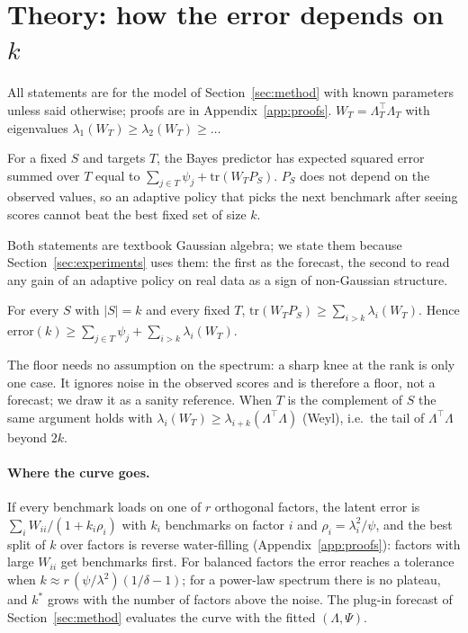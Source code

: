 \section{Theory: how the error depends on $k$}
\label{sec:theory}
All statements are for the model of Section~\ref{sec:method} with known parameters unless said otherwise; proofs are in Appendix~\ref{app:proofs}.
$W_T=\Lambda_T^\top\Lambda_T$ with eigenvalues $\lambda_1(W_T)\ge\lambda_2(W_T)\ge\dots$

\begin{proposition}\label{prop:decomp}
For a fixed $S$ and targets $T$, the Bayes predictor has expected squared error summed over $T$ equal to $\sum_{j\in T}\psi_j+\mathrm{tr}(W_TP_S)$. $P_S$ does not depend on the observed values, so an adaptive policy that picks the next benchmark after seeing scores cannot beat the best fixed set of size $k$.
\end{proposition}
Both statements are textbook Gaussian algebra; we state them because Section~\ref{sec:experiments} uses them: the first as the forecast, the second to read any gain of an adaptive policy on real data as a sign of non-Gaussian structure.

\begin{proposition}\label{prop:floor}
For every $S$ with $|S|=k$ and every fixed $T$, $\mathrm{tr}(W_TP_S)\ge\sum_{i>k}\lambda_i(W_T)$. Hence $\mathrm{error}(k)\ge\sum_{j\in T}\psi_j+\sum_{i>k}\lambda_i(W_T)$.
\end{proposition}
The floor needs no assumption on the spectrum: a sharp knee at the rank is only one case.
It ignores noise in the observed scores and is therefore a floor, not a forecast; we draw it as a sanity reference.
When $T$ is the complement of $S$ the same argument holds with $\lambda_i(W_T)\ge\lambda_{i+k}(\Lambda^\top\Lambda)$ (Weyl), i.e.\ the tail of $\Lambda^\top\Lambda$ beyond $2k$.

\paragraph{Where the curve goes.}
If every benchmark loads on one of $r$ orthogonal factors, the latent error is $\sum_i W_{ii}/(1+k_i\rho_i)$ with $k_i$ benchmarks on factor $i$ and $\rho_i=\lambda_i^2/\psi$, and the best split of $k$ over factors is reverse water-filling (Appendix~\ref{app:proofs}): factors with large $W_{ii}$ get benchmarks first.
For balanced factors the error reaches a tolerance when $k\approx r\,(\psi/\lambda^2)(1/\delta-1)$; for a power-law spectrum there is no plateau, and $k^\ast$ grows with the number of factors above the noise.
The plug-in forecast of Section~\ref{sec:method} evaluates the curve with the fitted $(\Lambda,\Psi)$.

